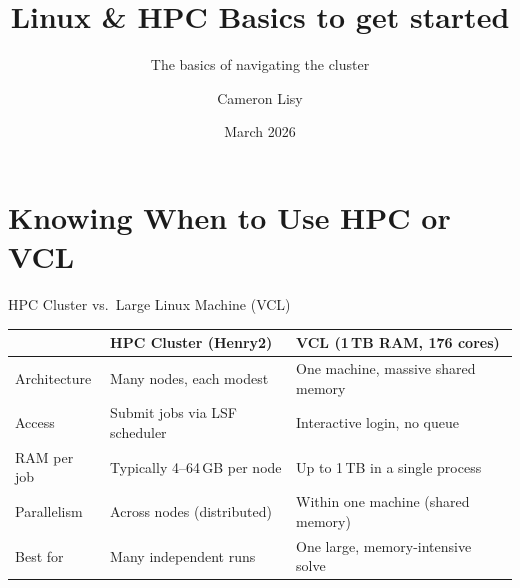 \documentclass[aspectratio=169, 11pt]{beamer}
\title{Linux \& HPC Basics to get started}
\subtitle{The basics of navigating the cluster}
\author{Cameron Lisy}
\date{March 2026}
\institute{Operations Research Seminar Series}
\begin{document}
\maketitle


\section{Knowing When to Use HPC or VCL}

\begin{frame}{HPC Cluster vs.\ Large Linux Machine (VCL)}
  \begin{table}
    \centering
    \small
    \begin{tabular}{l|l|l}
      \toprule
      & \textbf{HPC Cluster (Henry2)} & \textbf{VCL (1\,TB RAM, 176 cores)} \\
      \midrule
      Architecture    & Many nodes, each modest           & One machine, massive shared memory \\
      \midrule
      Access          & Submit jobs via LSF scheduler     & Interactive login, no queue \\
      \midrule
      RAM per job     & Typically 4--64\,GB per node      & Up to 1\,TB in a single process \\
      \midrule
      Parallelism     & Across nodes (distributed)        & Within one machine (shared memory) \\
      \midrule
      Best for        & Many independent runs             & One large, memory-intensive solve \\
      \bottomrule
    \end{tabular}
  \end{table}
\end{frame}
\end{document}
